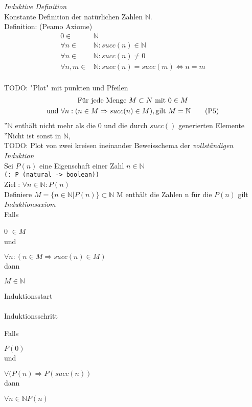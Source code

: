 \emph{Induktive Definition}\\
Konstante Definition der natürlichen Zahlen $\mathbb{N}$.\\
Definition: (Peamo Axiome)
\begin{align}
	0 \in& \mathbb{N} \tag{P1} \\
	\forall n \in& \mathbb{N}: succ(n) \in \mathbb{N} \tag{P2}\\
	\forall n \in& \mathbb{N}: succ(n) \ne 0 \tag{P3}\\
	\forall n,m \in& \mathbb{N} : succ(n) = succ(m) \Leftrightarrow n = m \tag{P4}
\end{align}\\
TODO: "Plot" mit punkten und Pfeilen
\begin{multline}
	\text{Für jede Menge }M \subset N \text{ mit } 0 \in M \\
	\text{und } \forall n : (n \in M \Rightarrow succ(n) \in M), \text{gilt } M = \mathbb{N} \tag{P5}
\end{multline}
''$\mathbb{N}$ enthält nicht mehr als die 0 und die durch $succ()$ generierten Elemente\\
''Nicht ist sonst in $\mathbb{N}$,\\
TODO: Plot von zwei kreisen ineinander
Beweisschema der {\em vollständigen Induktion}\\
Sei $P(n)$ eine Eigenschaft einer Zahl $n \in \mathbb{N}$\\
\lstinline|(: P (natural -> boolean))|\\
Ziel : $\forall n \in \mathbb{N} : P(n)$\\
Definiere $M = \{n \in \mathbb{N} \vert P(n) \} \subset \mathbb{N}$\hfill
M enthält die Zahlen n für die $P(n)$ gilt \\
\emph{Induktionsaxiom}\\
Falls \par 0 $\in M$\\
und \par $\forall n : (n \in M \Rightarrow succ(n) \in M)$\\
dann \par $M \in \mathbb{N}$\\
\begin{minipage}[c]{0.235\textwidth}
	Induktionsstart\bigskip\\
	\ \\
	Induktionsschritt
\end{minipage}
\begin{minipage}[c]{0.765\textwidth}
	\begin{mdframed}
		Falls \par $P(0)$\\
		und \par $\forall (P(n) \Rightarrow P(succ(n))$\\
		dann \par $\forall n \in \mathbb{N} P(n)$
	\end{mdframed}
\end{minipage}
